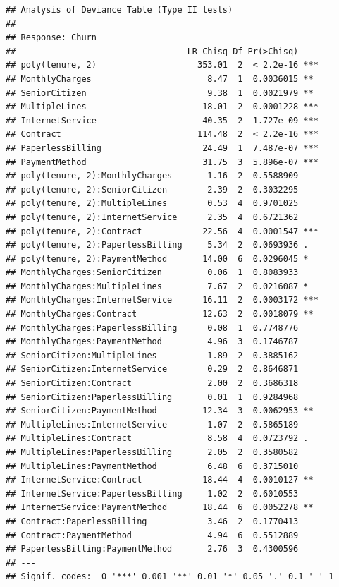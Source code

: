 \documentclass[
]{article}
\begin{document}
\begin{verbatim}
## Analysis of Deviance Table (Type II tests)
## 
## Response: Churn
##                                  LR Chisq Df Pr(>Chisq)    
## poly(tenure, 2)                    353.01  2  < 2.2e-16 ***
## MonthlyCharges                       8.47  1  0.0036015 ** 
## SeniorCitizen                        9.38  1  0.0021979 ** 
## MultipleLines                       18.01  2  0.0001228 ***
## InternetService                     40.35  2  1.727e-09 ***
## Contract                           114.48  2  < 2.2e-16 ***
## PaperlessBilling                    24.49  1  7.487e-07 ***
## PaymentMethod                       31.75  3  5.896e-07 ***
## poly(tenure, 2):MonthlyCharges       1.16  2  0.5588909    
## poly(tenure, 2):SeniorCitizen        2.39  2  0.3032295    
## poly(tenure, 2):MultipleLines        0.53  4  0.9701025    
## poly(tenure, 2):InternetService      2.35  4  0.6721362    
## poly(tenure, 2):Contract            22.56  4  0.0001547 ***
## poly(tenure, 2):PaperlessBilling     5.34  2  0.0693936 .  
## poly(tenure, 2):PaymentMethod       14.00  6  0.0296045 *  
## MonthlyCharges:SeniorCitizen         0.06  1  0.8083933    
## MonthlyCharges:MultipleLines         7.67  2  0.0216087 *  
## MonthlyCharges:InternetService      16.11  2  0.0003172 ***
## MonthlyCharges:Contract             12.63  2  0.0018079 ** 
## MonthlyCharges:PaperlessBilling      0.08  1  0.7748776    
## MonthlyCharges:PaymentMethod         4.96  3  0.1746787    
## SeniorCitizen:MultipleLines          1.89  2  0.3885162    
## SeniorCitizen:InternetService        0.29  2  0.8646871    
## SeniorCitizen:Contract               2.00  2  0.3686318    
## SeniorCitizen:PaperlessBilling       0.01  1  0.9284968    
## SeniorCitizen:PaymentMethod         12.34  3  0.0062953 ** 
## MultipleLines:InternetService        1.07  2  0.5865189    
## MultipleLines:Contract               8.58  4  0.0723792 .  
## MultipleLines:PaperlessBilling       2.05  2  0.3580582    
## MultipleLines:PaymentMethod          6.48  6  0.3715010    
## InternetService:Contract            18.44  4  0.0010127 ** 
## InternetService:PaperlessBilling     1.02  2  0.6010553    
## InternetService:PaymentMethod       18.44  6  0.0052278 ** 
## Contract:PaperlessBilling            3.46  2  0.1770413    
## Contract:PaymentMethod               4.94  6  0.5512889    
## PaperlessBilling:PaymentMethod       2.76  3  0.4300596    
## ---
## Signif. codes:  0 '***' 0.001 '**' 0.01 '*' 0.05 '.' 0.1 ' ' 1
\end{verbatim}
\end{document}
